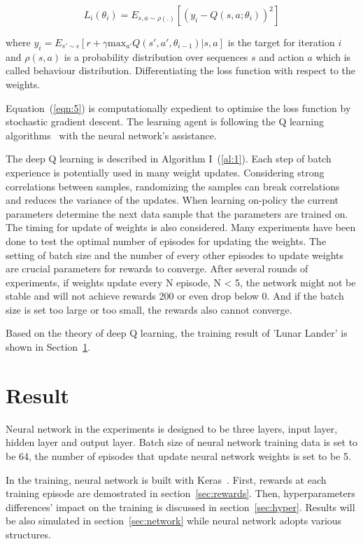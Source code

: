 \documentclass[conference]{IEEEtran}
\begin{document}
\begin{equation}\label{eqn:5}
    L_i(\theta_i) = E_{s,a\sim\rho(.)}[(y_i - Q(s,a;\theta_i))^2]
\end{equation}

where $y_i = E_{s{}'\sim\epsilon}[r+\gamma \text{max}_{a{}'}Q(s{}',a{}',\theta_{i-1})|s,a]$ is the target for iteration $i$ and $\rho(s,a)$ is a probability distribution over sequences $s$ and action $a$ which is called behaviour distribution. Differentiating the loss function with respect to the weights.

Equation~(\ref{eqn:5}) is computationally expedient to optimise the loss function by stochastic gradient descent. The learning agent is following the Q learning algorithms~\cite{b3} with the neural network's assistance.

The deep Q learning is described in Algorithm I~(\ref{al:1}). Each step of batch experience is potentially used in many weight updates. Considering strong correlations between samples, randomizing the samples can break correlations and reduces the variance of the updates. When learning on-policy the current parameters determine the next data sample that the parameters are trained on. The timing for update of weights is also considered. Many experiments have been done to test the optimal number of episodes for updating the weights. The setting of batch size and the number of every other episodes to update weights are crucial parameters for rewards to converge. After several rounds of experiments, if weights update every N episode, N < 5, the network might not be stable and will not achieve rewards 200 or even drop below 0. And if the batch size is set too large or too small, the rewards also cannot converge.

Based on the theory of deep Q learning, the training result of 'Lunar Lander' is shown in Section~\ref{sec:result}.

\section{Result}\label{sec:result}

Neural network in the experiments is designed to be three layers, input layer, hidden layer and output layer. Batch size of neural network training data is set to be 64, the number of episodes that update neural network weights is set to be 5.

In the training, neural network is built with Keras~\cite{b4}. First, rewards at each training episode are demostrated in section~\ref{sec:rewards}. Then, hyperparameters differences' impact on the training is discussed in section~\ref{sec:hyper}. Results will be also simulated in section~\ref{sec:network} while neural network adopts various structures.
\end{document}
